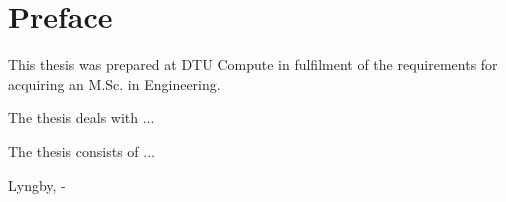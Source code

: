 \chapter{Preface}

This thesis was prepared at DTU Compute in fulfilment of the requirements for acquiring an M.Sc. in Engineering.

The thesis deals with ...

The thesis consists of ...
\vspace{20mm}
\begin{center}
    \hspace{20mm} Lyngby, \thesishandin-\thesisyear
    \vspace{5mm}
    \newline
  \thesisauthor
\end{center}
